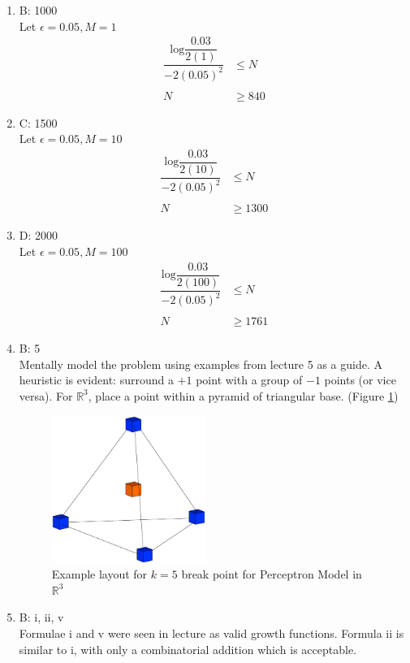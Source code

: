 \documentclass[11pt]{article}
\newcommand{\R}{\mathbb{R}}
\theoremstyle{definition}
\begin{document}
\begin{enumerate}
\item B: 1000\\
	Let  $\epsilon=0.05, M = 1$
	\begin{align*}
	\dfrac{\text{log}\dfrac{0.03}{2(1)}}{-2 (0.05)^2} &\leq N\\\ \\
	N &\geq 840
	\end{align*}
\item C: 1500\\
	Let  $\epsilon=0.05, M = 10$
	\begin{align*}
	\dfrac{\text{log}\dfrac{0.03}{2(10)}}{-2 (0.05)^2} &\leq N\\\ \\
	N &\geq 1300
	\end{align*}
\item D: 2000\\
	Let  $\epsilon=0.05, M = 100$
	\begin{align*}
	\dfrac{\text{log}\dfrac{0.03}{2(100)}}{-2 (0.05)^2} &\leq N\\\ \\
	N &\geq 1761
	\end{align*}
\item B: 5 \\
Mentally model the problem using examples from lecture 5 as a guide. A heuristic is evident: surround a $+1$ point with a group of $-1$ points (or vice versa). For $\R^3$, place a point within a pyramid of triangular base. (Figure \ref{breakpointR3})
	\begin{figure}[ht!]
	\centering
	\includegraphics[width=50mm]{hw03q04model.eps}
	\caption{Example layout for $k=5$ break point for Perceptron Model in $\R^3$}
	\label{breakpointR3}
	\end{figure}
	
\newpage
\item B: i, ii, v\\
Formulae i and v were seen in lecture as valid growth functions. Formula ii is similar to i, with only a combinatorial addition which is acceptable.


\end{enumerate}
\end{document}
